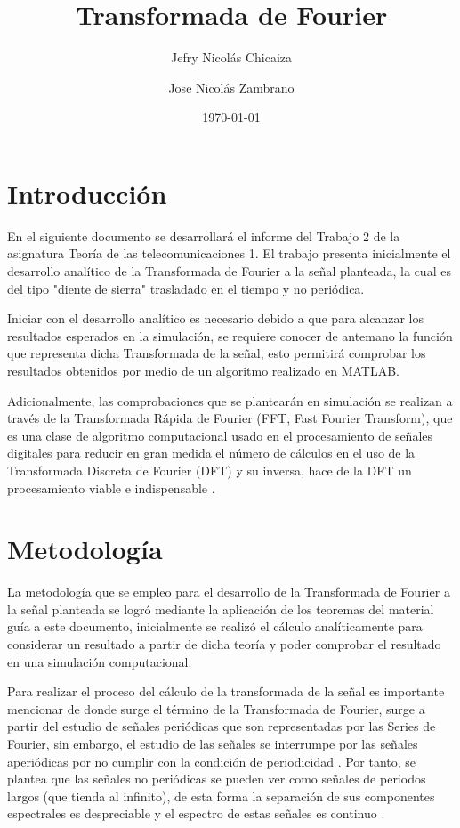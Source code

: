\documentclass[11pt,a4paper,twocolumn]{article}
\date{\today}
\title{
    \fontsize{26}{26}\selectfont 
    \textbf{Transformada de Fourier}}
\author[1]{Jefry Nicolás Chicaiza}
\author[2]{Jose Nicolás Zambrano}
\affil[1]{jefryn@unicauca.edu.co}
\affil[2]{jnzambranob@unicauca.edu.co}
\date{}
\begin{document}
\maketitle
\thispagestyle{fancy}
\section{Introducción}
    En el siguiente documento se desarrollará el informe del Trabajo 2 de la asignatura 
    Teoría de las telecomunicaciones 1. El trabajo presenta inicialmente el desarrollo 
    analítico de la Transformada de Fourier a la señal planteada, la cual es del tipo 
    "diente de sierra"  trasladado en el tiempo y no periódica.
    
    Iniciar con el desarrollo analítico es necesario debido a que para alcanzar los 
    resultados esperados en la simulación, se requiere conocer de antemano la función que 
    representa dicha Transformada de la señal, esto permitirá comprobar los resultados 
    obtenidos por medio de un algoritmo realizado en MATLAB.
    
    Adicionalmente, las comprobaciones que se plantearán en simulación se realizan a través 
    de la Transformada Rápida de Fourier (FFT, Fast Fourier Transform), que es una clase de 
    algoritmo computacional usado en el procesamiento de señales digitales para reducir en gran 
    medida el número de cálculos en el uso de la Transformada Discreta de Fourier (DFT) y su 
    inversa, hace de la DFT un procesamiento viable e indispensable \cite{Poularikas2007}.

       
\section{Metodología}
    La metodología que se empleo para el desarrollo de la Transformada de Fourier a la señal planteada 
    se logró mediante la aplicación de los teoremas del material guía a este documento, inicialmente
    se realizó el cálculo analíticamente para considerar un resultado a partir de dicha teoría y
    poder comprobar el resultado en una simulación computacional. 
    
    Para realizar el proceso del cálculo de la transformada de la señal es importante mencionar
    de donde surge el término de la Transformada de Fourier, surge a partir del estudio de señales
    periódicas que son representadas por las Series de Fourier, sin embargo, el estudio de las 
    señales se interrumpe por las señales aperiódicas por no cumplir con la condición de periodicidad \cite{Sauchelli2020}.
    Por tanto, se plantea que las señales no periódicas se pueden ver como señales de periodos 
    largos (que tienda al infinito), de esta forma la separación de sus componentes espectrales es
    despreciable y el espectro de estas señales es continuo \cite{Silva2021}.
    
\end{document}
